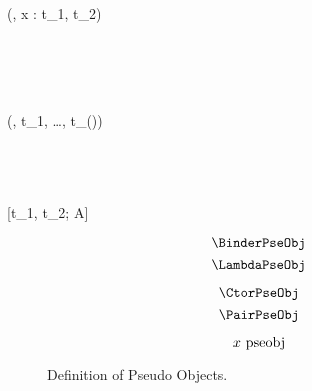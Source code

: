 
\Rule{\BinderPseObj}
    {
         \\
         \\
    }
    {(\kappa, x : t_1, t_2) \pseobj}
    {}

\Rule{\LambdaPseObj}
    {
         \\
         \\
    }
    { \pseobj}
    {}

\Rule{\CtorPseObj}
    {
         \\
    }
    {(\kappa, t_1, \ldots, t_{(\kappa)}) \pseobj}
    {}

\Rule{\PairPseObj}
    {
         \\
         \\
         \\
    }
    {[t_1, t_2; A] \pseobj}
    {}

\begin{figure}
    \centering
    \begin{minipage}{0.5\textwidth}
        $$\BinderPseObj$$
        $$\LambdaPseObj$$
    \end{minipage}%
    \begin{minipage}{0.5\textwidth}
        $$\CtorPseObj$$
        $$\PairPseObj$$
    \end{minipage}%
    $$x ~\mbox{\normalfont pseobj}$$
    \caption{Definition of Pseudo Objects.}
\end{figure}
